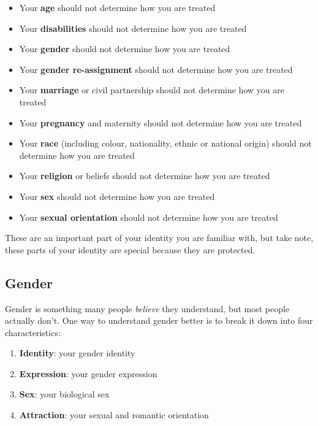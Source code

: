 \documentclass[
]{book}
\providecommand{\tightlist}{%
  \setlength{\itemsep}{0pt}\setlength{\parskip}{0pt}}
\begin{document}
\begin{itemize}
\tightlist
\item
  Your \textbf{age} should not determine how you are treated
\item
  Your \textbf{disabilities} should not determine how you are treated
\item
  Your \textbf{gender} should not determine how you are treated \citep{inferior, damore, damoreguardian, everydaysexism}
\item
  Your \textbf{gender re-assignment} should not determine how you are treated
\item
  Your \textbf{marriage} or civil partnership should not determine how you are treated
\item
  Your \textbf{pregnancy} and maternity should not determine how you are treated
\item
  Your \textbf{race} (including colour, nationality, ethnic or national origin) should not determine how you are treated \citep{nottalking, superior}
\item
  Your \textbf{religion} or beliefs should not determine how you are treated
\item
  Your \textbf{sex} should not determine how you are treated \citep{harassment}
\item
  Your \textbf{sexual orientation} should not determine how you are treated \citep{nosex}
\end{itemize}

These are an important part of your identity you are familiar with, but take note, these parts of your identity are special because they are protected.

\hypertarget{genderid}{%
\subsection{Gender}\label{genderid}}

Gender is something many people \emph{believe} they understand, but most people actually don't. One way to understand gender better is to break it down into four characteristics:

\begin{enumerate}
\def\labelenumi{\arabic{enumi}.}
\tightlist
\item
  \textbf{Identity}: your gender identity
\item
  \textbf{Expression}: your gender expression
\item
  \textbf{Sex}: your biological sex
\item
  \textbf{Attraction}: your sexual and romantic orientation
\end{enumerate}
\end{document}
